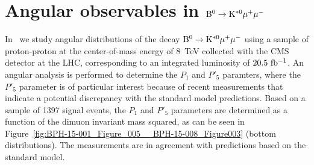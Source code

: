 \documentclass{PoS}
\begin{document}
\section{Angular observables in ${\rm B^0 \to K^{*0}\mu^+\mu^-}$}

In~\cite{bph-15-008} we study angular distributions of the decay
${\rm B^0 \to K^{*0}\mu^+\mu^-}$ using a sample of proton-proton at the
center-of-mass energy of 8~TeV collected with the CMS detector at the LHC,
corresponding to an integrated luminosity of ${\rm 20.5~fb^{-1}}$. An
angular analysis is performed to determine the $P_1$ and $P'_5$ paramters,
where the $P'_5$ parameter is of particular interest because of recent
measurements that indicate a potential discrepancy with the standard model
predictions. Based on a sample of 1397 signal events, the $P_1$ and
$P'_5$ parameters are determined as a function of the dimuon invariant mass
squared, as can be seen in
Figure~\ref{fig:BPH-15-001_Figure_005__BPH-15-008_Figure003}
(bottom distributions). The measurements are in agreement with predictions
based on the standard model.
\end{document}
